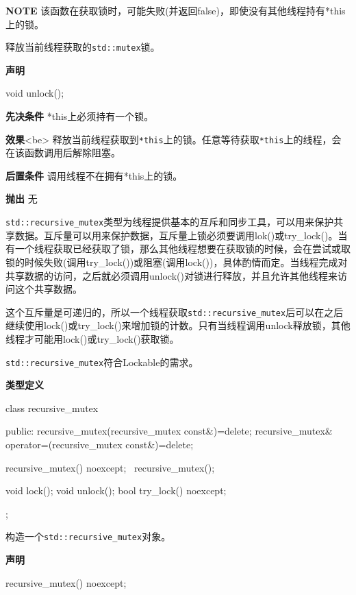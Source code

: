 \textbf{NOTE} 该函数在获取锁时，可能失败(并返回false)，即使没有其他线程持有*this上的锁。


释放当前线程获取的\texttt{std::mutex}锁。

\textbf{声明}

\begin{cpp}
void unlock();
\end{cpp}

\textbf{先决条件}
*this上必须持有一个锁。

\textbf{效果}<be>
释放当前线程获取到\texttt{*this}上的锁。任意等待获取\texttt{*this}上的线程，会在该函数调用后解除阻塞。

\textbf{后置条件}
调用线程不在拥有*this上的锁。

\textbf{抛出}
无


\texttt{std::recursive\_mutex}类型为线程提供基本的互斥和同步工具，可以用来保护共享数据。互斥量可以用来保护数据，互斥量上锁必须要调用lok()或try\_lock()。当有一个线程获取已经获取了锁，那么其他线程想要在获取锁的时候，会在尝试或取锁的时候失败(调用try\_lock())或阻塞(调用lock())，具体酌情而定。当线程完成对共享数据的访问，之后就必须调用unlock()对锁进行释放，并且允许其他线程来访问这个共享数据。

这个互斥量是可递归的，所以一个线程获取\texttt{std::recursive\_mutex}后可以在之后继续使用lock()或try\_lock()来增加锁的计数。只有当线程调用unlock释放锁，其他线程才可能用lock()或try\_lock()获取锁。

\texttt{std::recursive\_mutex}符合Lockable的需求。

\textbf{类型定义}

\begin{cpp}
class recursive_mutex
{
public:
  recursive_mutex(recursive_mutex const&)=delete;
  recursive_mutex& operator=(recursive_mutex const&)=delete;

  recursive_mutex() noexcept;
 ~recursive_mutex();

  void lock();
  void unlock();
  bool try_lock() noexcept;
};
\end{cpp}


构造一个\texttt{std::recursive\_mutex}对象。

\textbf{声明}

\begin{cpp}
recursive_mutex() noexcept;
\end{cpp}


